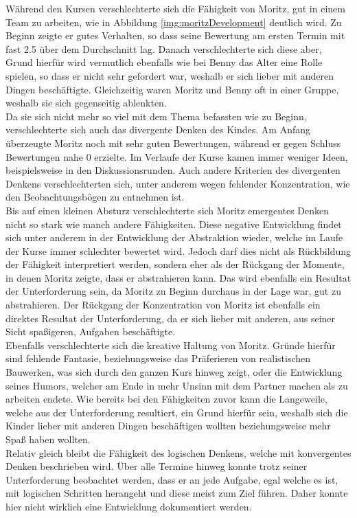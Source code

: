 Während den Kursen verschlechterte sich die Fähigkeit von Moritz, gut in einem Team zu arbeiten, wie in Abbildung \ref{img:moritzDevelopment} deutlich wird. Zu Beginn zeigte er gutes Verhalten, so dass seine Bewertung am ersten Termin mit fast 2.5 über dem Durchschnitt lag. Danach verschlechterte sich diese aber, Grund hierfür wird vermutlich ebenfalls wie bei Benny das Alter eine Rolle spielen, so dass er nicht sehr gefordert war, weshalb er sich lieber mit anderen Dingen beschäftigte. Gleichzeitig waren Moritz und Benny oft in einer Gruppe, weshalb sie sich gegenseitig ablenkten. \\
Da sie sich nicht mehr so viel mit dem Thema befassten wie zu Beginn, verschlechterte sich auch das divergente Denken des Kindes. Am Anfang überzeugte Moritz noch mit sehr guten Bewertungen, während er gegen Schluss Bewertungen nahe 0 erzielte. Im Verlaufe der Kurse kamen immer weniger Ideen, beispielsweise in den Diskussionsrunden. Auch andere Kriterien des divergenten Denkens verschlechterten sich, unter anderem wegen fehlender Konzentration, wie den Beobachtungsbögen zu entnehmen ist.\\
Bis auf einen kleinen Absturz verschlechterte sich Moritz emergentes Denken nicht so stark wie manch andere Fähigkeiten. Diese negative Entwicklung findet sich unter anderem in der Entwicklung der Abstraktion wieder, welche im Laufe der Kurse immer schlechter bewertet wird. Jedoch darf dies nicht als Rückbildung der Fähigkeit interpretiert werden, sondern eher als der Rückgang der Momente, in denen Moritz zeigte, dass er abstrahieren kann. Das wird ebenfalls ein Resultat der Unterforderung sein, da Moritz zu Beginn durchaus in der Lage war, gut zu abstrahieren. Der Rückgang der Konzentration von Moritz ist ebenfalls ein direktes Resultat der Unterforderung, da er sich lieber mit anderen, aus seiner Sicht spaßigeren, Aufgaben beschäftigte.\\
Ebenfalls verschlechterte sich die kreative Haltung von Moritz. Gründe hierfür sind fehlende Fantasie, beziehungsweise das Präferieren von realistischen Bauwerken, was sich durch den ganzen Kurs hinweg zeigt, oder die Entwicklung seines Humors, welcher am Ende in mehr Unsinn mit dem Partner machen als zu arbeiten endete. Wie bereits bei den Fähigkeiten zuvor kann die Langeweile, welche aus der Unterforderung resultiert, ein Grund hierfür sein, weshalb sich die Kinder lieber mit anderen Dingen beschäftigen wollten beziehungsweise mehr Spaß haben wollten.\\
Relativ gleich bleibt die Fähigkeit des logischen Denkens, welche mit konvergentes Denken beschrieben wird. Über alle Termine hinweg konnte trotz seiner Unterforderung beobachtet werden, dass er an jede Aufgabe, egal welche es ist, mit logischen Schritten herangeht und diese meist zum Ziel führen. Daher konnte hier nicht wirklich eine Entwicklung dokumentiert werden.


